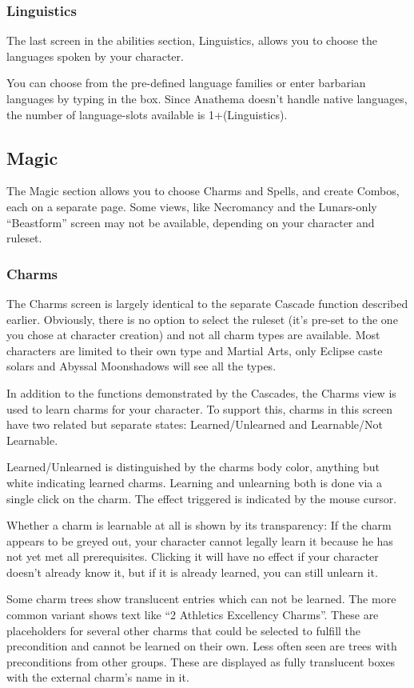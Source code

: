 \subsubsection{Linguistics}
The last screen in the abilities section, Linguistics, allows you to choose the languages spoken by your character.

You can choose from the pre-defined language families or enter barbarian languages by typing in the box. Since Anathema doesn't handle native languages, the number of language-slots available is 1+(Linguistics).

\subsection{Magic}
The Magic section allows you to choose Charms and Spells, and create Combos, each on a separate page. Some views, like Necromancy and the Lunars-only "`Beastform"' screen may not be available, depending on your character and ruleset.


\subsubsection{Charms}The Charms screen is largely identical to the separate Cascade function described earlier. Obviously, there is no option to select the ruleset (it's pre-set to the one you chose at character creation) and not all charm types are available. Most characters are limited to their own type and Martial Arts, only Eclipse caste solars and Abyssal Moonshadows will see all the types. 

In addition to the functions demonstrated by the Cascades, the Charms view is used to learn charms for your character. To support this, charms in this screen have two related but separate states: Learned/Unlearned and Learnable/Not Learnable. 

Learned/Unlearned is distinguished by the charms body color, anything but white indicating learned charms. Learning and unlearning both is done via a single click on the charm. The effect triggered is indicated by the mouse cursor.

Whether a charm is learnable at all is shown by its transparency: If the charm appears to be greyed out, your character cannot legally learn it because he has not yet met all prerequisites. Clicking it will have no effect if your character doesn't already know it, but if it is already learned, you can still unlearn it.

Some charm trees show translucent entries which can not be learned. The more common variant shows text like "`2 Athletics Excellency Charms"'. These are placeholders for several other charms that could be selected to fulfill the precondition and cannot be learned on their own. Less often seen are trees with preconditions from other groups. These are displayed as fully translucent boxes with the external charm's name in it.

